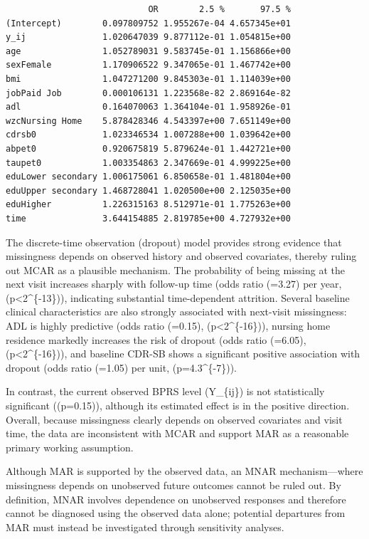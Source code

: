 \documentclass[
  11pt,
  letterpaper,
  DIV=11,
  numbers=noendperiod]{scrartcl}
\begin{document}
\begin{verbatim}
                            OR        2.5 %       97.5 %
(Intercept)        0.097809752 1.955267e-04 4.657345e+01
y_ij               1.020647039 9.877112e-01 1.054815e+00
age                1.052789031 9.583745e-01 1.156866e+00
sexFemale          1.170906522 9.347065e-01 1.467742e+00
bmi                1.047271200 9.845303e-01 1.114039e+00
jobPaid Job        0.000106131 1.223568e-82 2.869164e-82
adl                0.164070063 1.364104e-01 1.958926e-01
wzcNursing Home    5.878428346 4.543397e+00 7.651149e+00
cdrsb0             1.023346534 1.007288e+00 1.039642e+00
abpet0             0.920675819 5.879624e-01 1.442721e+00
taupet0            1.003354863 2.347669e-01 4.999225e+00
eduLower secondary 1.006175061 6.850658e-01 1.481804e+00
eduUpper secondary 1.468728041 1.020500e+00 2.125035e+00
eduHigher          1.226315163 8.512971e-01 1.775263e+00
time               3.644154885 2.819785e+00 4.727932e+00
\end{verbatim}

The discrete-time observation (dropout) model provides strong evidence
that missingness depends on observed history and observed covariates,
thereby ruling out MCAR as a plausible mechanism. The probability of
being missing at the next visit increases sharply with follow-up time
(odds ratio (=3.27) per year, (p\textless2\^{}\{-13\})),
indicating substantial time-dependent attrition. Several baseline
clinical characteristics are also strongly associated with next-visit
missingness: ADL is highly predictive (odds ratio (=0.15),
(p\textless2\^{}\{-16\})), nursing home residence markedly
increases the risk of dropout (odds ratio (=6.05),
(p\textless2\^{}\{-16\})), and baseline CDR-SB shows a
significant positive association with dropout (odds ratio (=1.05) per
unit, (p=4.3\^{}\{-7\})).

In contrast, the current observed BPRS level (Y\_\{ij\}) is not
statistically significant ((p=0.15)), although its estimated effect is
in the positive direction. Overall, because missingness clearly depends
on observed covariates and visit time, the data are inconsistent with
MCAR and support MAR as a reasonable primary working assumption.

Although MAR is supported by the observed data, an MNAR
mechanism---where missingness depends on unobserved future outcomes
cannot be ruled out. By definition, MNAR involves dependence on
unobserved responses and therefore cannot be diagnosed using the
observed data alone; potential departures from MAR must instead be
investigated through sensitivity analyses.
\end{document}
